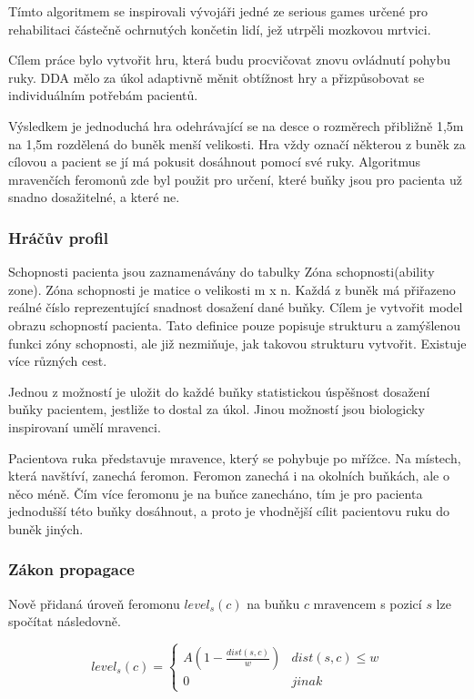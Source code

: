 Tímto algoritmem se inspirovali vývojáři jedné ze serious games určené pro rehabilitaci částečně ochrnutých končetin lidí, jež utrpěli mozkovou mrtvici\cite{26poststroke}.

Cílem práce bylo vytvořit hru, která budu procvičovat znovu ovládnutí pohybu ruky. DDA mělo za úkol adaptivně měnit obtížnost hry a přizpůsobovat se individuálním potřebám pacientů. 

Výsledkem je jednoduchá hra odehrávající se na desce o rozměrech přibližně 1,5m na 1,5m rozdělená do buněk menší velikosti. Hra vždy označí některou z buněk za cílovou a pacient se jí má pokusit dosáhnout pomocí své ruky. Algoritmus mravenčích feromonů zde byl použit pro určení, které buňky jsou pro pacienta už snadno dosažitelné, a které ne.

\subsubsection{Hráčův profil}

Schopnosti pacienta jsou zaznamenávány do tabulky Zóna schopnosti(ability zone). Zóna schopnosti je matice o velikosti m x n. Každá z buněk má přiřazeno reálné číslo reprezentující snadnost dosažení dané buňky. Cílem je vytvořit model obrazu schopností pacienta.
Tato definice pouze popisuje strukturu a zamýšlenou funkci zóny schopnosti, ale již nezmiňuje, jak takovou strukturu vytvořit. Existuje více různých cest.

Jednou z možností je uložit do každé buňky statistickou úspěšnost dosažení buňky pacientem, jestliže to dostal za úkol. Jinou možností jsou biologicky inspirovaní umělí mravenci.

Pacientova ruka představuje mravence, který se pohybuje po mřížce. Na místech, která navštíví, zanechá feromon. Feromon zanechá i na okolních buňkách, ale o něco méně. Čím více feromonu je na buňce zanecháno, tím je pro pacienta jednodušší této buňky dosáhnout, a proto je vhodnější cílit pacientovu ruku do buněk jiných.

\subsubsection{Zákon propagace}

Nově přidaná úroveň feromonu $level_s(c)$ na buňku $c$ mravencem s pozicí $s$ lze spočítat následovně.


\begin{equation}
	level_s(c)= \begin{cases}
											  A(1-\frac{dist(s, c)}{w}) & dist(s, c) \leq w \\
												0 & jinak
										 \end{cases}
\end{equation}

